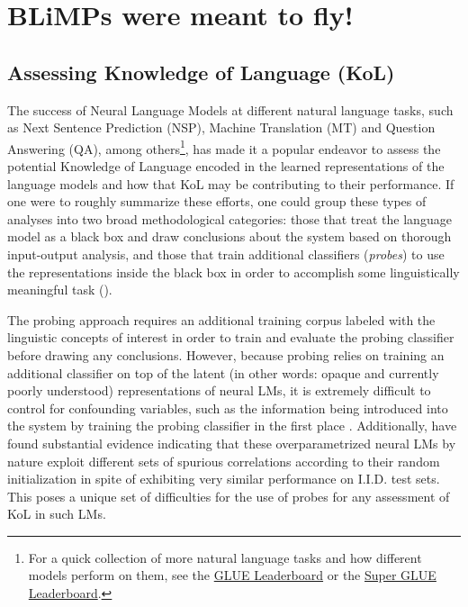 \chapter{BLiMPs were meant to fly!}

\section{Assessing Knowledge of Language (KoL)}
\label{section:kol}

The success of Neural Language Models at different natural language tasks, such as Next Sentence Prediction (NSP), Machine Translation (MT) and Question Answering (QA), among others\footnote{For a quick collection of more natural language tasks and how different models perform on them, see the \href{https://gluebenchmark.com/leaderboard}{GLUE Leaderboard} or the \href{https://super.gluebenchmark.com/leaderboard}{Super GLUE Leaderboard}.}, has made it a popular endeavor to assess the potential Knowledge of Language encoded in the learned representations of the language models and how that KoL may be contributing to their performance.  If one were to roughly summarize these efforts, one could group these types of analyses into two broad methodological categories: those that treat the language model as a black box and draw conclusions about the system based on thorough input-output analysis, and those that train additional classifiers (\textit{probes}) to use the representations inside the black box in order to accomplish some linguistically meaningful task (\citealp{conneau2018you,elazar2020bert}).

The probing approach requires an additional training corpus labeled with the linguistic concepts of interest in order to train and evaluate the probing classifier before drawing any conclusions.  However, because probing relies on training an additional classifier on top of the latent (in other words: opaque and currently poorly understood) representations of neural LMs, it is extremely difficult to control for confounding variables, such as the information being introduced into the system by training the probing classifier in the first place \citep{warstadt2019blimp}.  Additionally, \citet{d2020underspecification} have found substantial evidence indicating that these overparametrized neural LMs by nature exploit different sets of spurious correlations according to their random initialization in spite of exhibiting very similar performance on I.I.D. test sets.  This poses a unique set of difficulties for the use of probes for any assessment of KoL in such LMs. 

